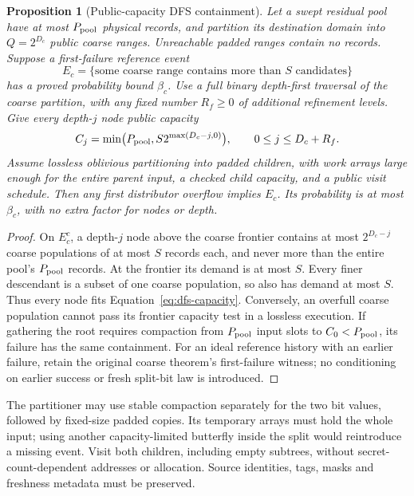 \documentclass[11pt]{article}
\newtheorem{proposition}[theorem]{Proposition}
\theoremstyle{definition}
\theoremstyle{remark}
\begin{document}
\begin{proposition}[Public-capacity DFS containment]
Let a swept residual pool have at most $P_{\rm pool}$ physical records, and partition
its destination domain into $Q=2^{D_c}$ public coarse ranges. Unreachable padded
ranges contain no records. Suppose a first-failure reference event
\[
 E_c=\{\text{some coarse range contains more than }S\text{ candidates}\}
\]
has a proved probability bound $\beta_c$. Use a full binary depth-first traversal
of the coarse partition, with any fixed number $R_f\ge0$ of additional
refinement levels. Give every depth-$j$ node public capacity
\begin{equation}\label{eq:dfs-capacity}
 C_j=\min\bigl(P_{\rm pool},S2^{\max(D_c-j,0)}\bigr),\qquad 0\le j\le D_c+R_f.
\end{equation}
Assume lossless oblivious partitioning into padded children, with work arrays
large enough for the entire parent input, a checked child capacity, and a
public visit schedule. Then any first distributor overflow implies $E_c$.
Its probability is at most $\beta_c$, with no extra factor for nodes or depth.
\end{proposition}
\begin{proof}
On $E_c^c$, a depth-$j$ node above the coarse frontier contains at most
$2^{D_c-j}$ coarse populations of at most $S$ records each, and never more
than the entire pool's $P_{\rm pool}$ records. At the frontier its demand is at most
$S$. Every finer descendant is a subset of one coarse population, so also
has demand at most $S$. Thus every node fits Equation~\eqref{eq:dfs-capacity}.
Conversely, an overfull coarse population cannot pass its frontier capacity
test in a lossless execution. If gathering the root requires compaction
from $P_{\rm pool}$ input slots to $C_0<P_{\rm pool}$, its failure has the same containment.
For an ideal reference history with an earlier failure, retain the original
coarse theorem's first-failure witness; no conditioning on earlier success
or fresh split-bit law is introduced.
\end{proof}

The partitioner may use stable compaction separately for the two bit values,
followed by fixed-size padded copies. Its temporary arrays must hold the
whole input; using another capacity-limited butterfly inside the split would
reintroduce a missing event. Visit both children, including empty subtrees,
without secret-count-dependent addresses or allocation. Source identities,
tags, masks and freshness metadata must be preserved.
\end{document}
